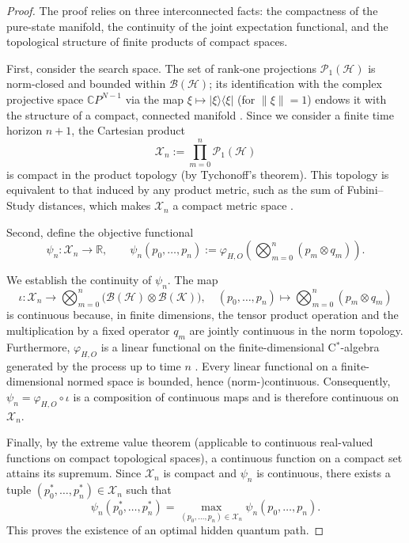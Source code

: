 \documentclass[12pt, reco]{article}
\begin{document}
\begin{proof}
The proof relies on three interconnected facts: the compactness of the pure-state manifold, the continuity of the joint expectation functional, and the topological structure of finite products of compact spaces.

First, consider the search space. The set of rank-one projections \(\mathcal{P}_1(\mathcal{H})\) is norm-closed and bounded within \(\mathcal{B}(\mathcal{H})\); its identification with the complex projective space \(\mathbb{C}P^{N-1}\) via the map \(\xi \mapsto |\xi\rangle\langle\xi|\) (for \(\|\xi\|=1\)) endows it with the structure of a compact, connected   manifold \cite{Nielsen2000}. Since we consider a finite time horizon \(n+1\), the Cartesian product
\[
\mathcal{X}_n := \prod_{m=0}^{n} \mathcal{P}_1(\mathcal{H})
\]
is compact in the product topology (by Tychonoff's theorem). This topology is equivalent to that induced by any product metric, such as the sum of Fubini–Study distances, which makes \(\mathcal{X}_n\) a compact metric space \cite{GeSunLee01, ticozzi2008}.

Second, define the objective functional
\[
\psi_n: \mathcal{X}_n \longrightarrow \mathbb{R}, \qquad \psi_n(p_0,\dots,p_n) := \varphi_{H,O}\!\left(\bigotimes_{m=0}^{n} (p_m \otimes q_m)\right).
\]

We establish the continuity of \(\psi_n\). The map
\[
\iota: \mathcal{X}_n \longrightarrow \bigotimes_{m=0}^{n} \bigl(\mathcal{B}(\mathcal{H}) \otimes \mathcal{B}(\mathcal{K})\bigr), \quad (p_0,\dots,p_n) \mapsto \bigotimes_{m=0}^{n} (p_m \otimes q_m)
\]
is continuous because, in finite dimensions, the tensor product operation and the multiplication by a fixed operator \(q_m\) are jointly continuous in the norm topology. Furthermore, \(\varphi_{H,O}\) is a linear functional on the finite-dimensional C$^*$-algebra generated by the process up to time \(n\) \cite{ASS20}. Every linear functional on a finite-dimensional normed space is bounded, hence (norm-)continuous. Consequently, \(\psi_n = \varphi_{H,O} \circ \iota\) is a composition of continuous maps and is therefore continuous on \(\mathcal{X}_n\).

Finally, by the extreme value theorem (applicable to continuous real-valued functions on compact topological spaces), a continuous function on a compact set attains its supremum. Since \(\mathcal{X}_n\) is compact and \(\psi_n\) is continuous, there exists a tuple \((p_0^*,\dots,p_n^*) \in \mathcal{X}_n\) such that
\[
\psi_n(p_0^*,\dots,p_n^*) = \max_{(p_0,\dots,p_n)\in\mathcal{X}_n} \psi_n(p_0,\dots,p_n).
\]
This proves the existence of an optimal hidden quantum path.
\end{proof}
\end{document}

